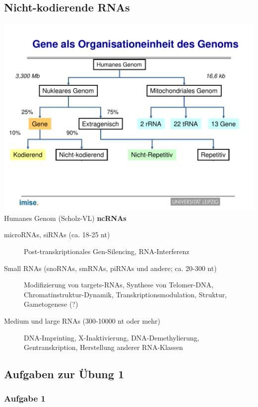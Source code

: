 \subsection{Nicht-kodierende RNAs}
\includegraphics[width=1\textwidth]{lectures/V1/pix/31.pdf}\\
Humanes Genom (Scholz-VL)
\textbf{ncRNAs}
\begin{description}
    \item[microRNAs, siRNAs (ca. 18-25 nt)] Post-transkriptionales Gen-Silencing, RNA-Interferenz
    \item[Small RNAs (snoRNAs, smRNAs, piRNAs und andere; ca. 20-300 nt)] Modifizierung von targets-RNAs, Synthese von Telomer-DNA, Chromatinstruktur-Dynamik, Transkriptionsmodulation, Struktur, Gametogenese (?)
    \item[Medium und large RNAs (300-10000 nt oder mehr)] DNA-Imprinting, X-Inaktivierung, DNA-Demethylierung, Gentranskription, Herstellung anderer RNA-Klassen
\end{description}

\newpage
\subsection{Aufgaben zur Übung 1}
\subsubsection{Aufgabe 1}

